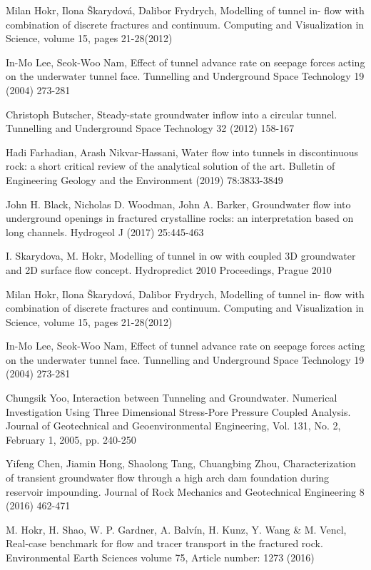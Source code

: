 \documentclass[a4paper]{article}
\begin{document}
\begin{thebibliography}{32}
	 Milan Hokr, Ilona Škarydová, Dalibor Frydrych, Modelling of tunnel in-
	flow with combination of discrete fractures and continuum. Computing
	and Visualization in Science, volume 15, pages 21-28(2012)
	
	 In-Mo Lee, Seok-Woo Nam, Effect of tunnel advance rate on seepage
	forces acting on the underwater tunnel face. Tunnelling and Underground
	Space Technology 19 (2004) 273-281
	
	 Christoph Butscher, Steady-state groundwater inflow into a circular
	tunnel. Tunnelling and Underground Space Technology 32 (2012) 158-167
	
	 Hadi Farhadian, Arash Nikvar-Hassani, Water flow into tunnels in discontinuous
	rock: a short critical review of the analytical solution of the art. Bulletin of Engineering Geology and the Environment (2019) 78:3833-3849
	
	 John H. Black, Nicholas D. Woodman, John A. Barker, Groundwater
	flow into underground openings in fractured crystalline rocks: an
	interpretation based on long channels. Hydrogeol J (2017) 25:445-463
	
	 I. Skarydova, M. Hokr, Modelling of tunnel in
ow with coupled 3D
	groundwater and 2D surface flow concept. Hydropredict 2010 Proceedings,
	Prague 2010
	
	 Milan Hokr, Ilona Škarydová, Dalibor Frydrych, Modelling of tunnel in-
	flow with combination of discrete fractures and continuum. Computing
	and Visualization in Science, volume 15, pages 21-28(2012)
	
	 In-Mo Lee, Seok-Woo Nam, Effect of tunnel advance rate on seepage
	forces acting on the underwater tunnel face. Tunnelling and Underground
	Space Technology 19 (2004) 273-281
	
	 Chungsik Yoo, Interaction between Tunneling and Groundwater. 				Numerical Investigation Using Three Dimensional Stress-Pore Pressure Coupled Analysis. Journal of Geotechnical and Geoenvironmental Engineering, Vol. 131, No. 2, February 1, 2005, pp. 240-250
	
	 Yifeng Chen, Jiamin Hong, Shaolong Tang, Chuangbing Zhou, Characterization
	of transient groundwater flow through a high arch dam foundation during reservoir impounding. Journal of Rock Mechanics and Geotechnical Engineering 8 (2016) 462-471
	
	 M. Hokr, H. Shao, W. P. Gardner, A. Balvín, H. Kunz, Y. Wang \& M. Vencl, Real-case benchmark for flow and tracer transport in the fractured rock. Environmental Earth Sciences volume 75, Article number: 1273 (2016)
	

\end{thebibliography}
\end{document}
